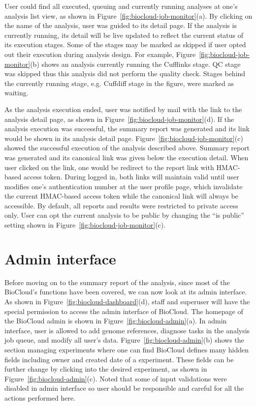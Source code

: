 User could find all executed, queuing and currently running analyses at one's
analysis list view, as shown in Figure~\ref{fig:biocloud-job-monitor}(a). By
clicking on the name of the analysis, user was guided to its detail page. If
the analysis is currently running, its detail will be live updated to reflect
the current status of its execution stages. Some of the stages may be marked as
skipped if user opted out their execution during analysis design. For example,
Figure~\ref{fig:biocloud-job-monitor}(b) shows an analysis currently running
the Cufflinks stage. QC stage was skipped thus this analysis did not perform
the quality check. Stages behind the currently running stage, e.g. Cuffdiff
stage in the figure, were marked as waiting.

As the analysis execution ended, user was notified by mail with the link to the
analysis detail page, as shown in Figure~\ref{fig:biocloud-job-monitor}(d). If
the analysis execution was successful, the summary report was generated and its
link would be shown in its analysis detail page.
Figure~\ref{fig:biocloud-job-monitor}(c) showed the successful execution of the
analysis described above. Summary report was generated and its canonical link
was given below the execution detail. When user clicked on the link, one would
be redirect to the report link with HMAC-based access token. During logged in,
both links will maintain valid until user modifies one's authentication number
at the user profile page, which invalidate the current HMAC-based access token
while the canonical link will always be accessible. By default, all reports and
results were restricted to private access only. User can opt the current
analysis to be public by changing the ``is public'' setting shown in
Figure~\ref{fig:biocloud-job-monitor}(c).



\section{Admin interface}
\label{s:biocloud-admin}



Before moving on to the summary report of the analysis, since most of the
BioCloud's functions have been covered, we can now look at its admin interface.
As shown in Figure~\ref{fig:biocloud-dashboard}(d), staff and superuser will
have the special permission to access the admin interface of BioCloud. The
homepage of the BioCloud admin is shown in Figure~\ref{fig:biocloud-admin}(a).
In admin interface, user is allowed to add genome references, diagnose tasks in
the analysis job queue, and modify all user's data.
Figure~\ref{fig:biocloud-admin}(b) shows the section managing experiments where
one can find BioCloud defines many hidden fields including owner and created
date of a experiment. These fields can be further change by clicking into the
desired experiment, as shown in Figure~\ref{fig:biocloud-admin}(c). Noted that
some of input validations were disabled in admin interface so user should be
responsible and careful for all the actions performed here.



